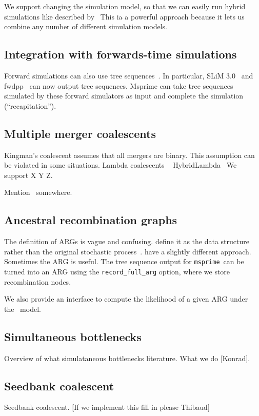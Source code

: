 \documentclass{article}
\newcommand{\msprime}[0]{\texttt{msprime}}
\begin{document}
We support changing the simulation model, so that we can easily
run hybrid simulations like described by~\cite{bhaskar2014distortion}
This ia a powerful approach because it lets us combine any
number of different simulation models.

\subsection*{Integration with forwards-time simulations}
Forward simulations can also use tree
sequences~\citep{kelleher2018efficient,haller2018tree}. In particular,
SLiM 3.0~\citep{haller2019slim} and fwdpp~\citep{thornton2014cpp} can now output tree sequences.
Msprime can take tree sequences simulated by these forward simulators
as input and complete the simulation (``recapitation'').

\subsection*{Multiple merger coalescents}
Kingman's coalescent assumes that all mergers are binary. This
assumption can be violated in some situations. Lambda coalescents
~\citep{donnelly1999particle,schweinsberg2000coalescents}
HybridLambda~\citep{zhu2015hybrid}
We support X Y Z.

Mention~\citep{becheler2020occupancy} somewhere.

\subsection*{Ancestral recombination graphs}
The definition of ARGs is vague and confusing.
\cite{minichiello2006mapping} define it as the data structure
rather than the original stochastic
process~\citep{griffiths1991two,griffiths1997ancestral}.
\cite{rasmussen2014genome} have a slightly different approach.
Sometimes the ARG is useful.
The tree sequence output for \msprime\ can be turned into
an ARG using the \texttt{record\_full\_arg} option, where we store
recombination nodes.

We also provide an interface to compute the likelihood of a given ARG
under the~\cite{kuhner2000maximum} model.

\subsection*{Simultaneous bottlenecks}
Overview of what simulataneous bottlenecks literature. What we
do [Konrad].


\subsection*{Seedbank coalescent}
Seedbank coalescent. [If we implement this fill in please Thibaud]
\end{document}
